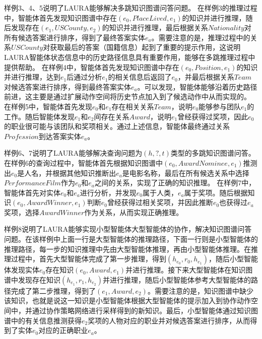 \documentclass[algorithmlist, AutoFakeBold, AutoFakeSlant, figurelist, tablelist, nomlist, engineering, openany]{seuthesix} %
\begin{document}
样例3、4、5说明了LAURA能够解决多跳知识图谱问答问题。
在样例3的推理过程中，智能体首先发现知识图谱中存在$(e_0, PlaceLived, e_1)$的知识并进行推理，随后发现存在$(e_1, USCounty, e_2)$的知识并进行推理，最后根据关系$Nationality$对所有候选答案进行排序，得到了最终答案实体$e_a$。需要注意的是，推理过程中的关系$USCounty$对获取最后的答案（国籍信息）起到了重要的提示作用，这说明LAURA智能体状态信息中的历史路径信息具有重要作用，能够在多跳推理过程中提供帮助。
在样例4中，智能体首先发现知识图谱中存在$(e_0, Position, e_1)$的知识并进行推理，达到$e_1$后通过分析$e_1$的相关信息后返回了$e_0$，并最后根据关系$Team$对候选答案进行排序，得到最终答案实体$e_a$。可以发现，智能体能够沿着历史路径前进，这主要是通过扩展动作空间将历史节点加入到了候选动作中从而实现的。
在样例5中，智能体首先发现$e_0$和$e_1$存在相关关系$Team$，说明$e_0$能够参与团队$e_1$的工作。随后智能体发现$e_1$和$e_2$间存在关系$Award$，说明$e_1$曾经获得过奖项，因此$e_0$的职业很可能与该团队和奖项相关。通过上述信息，智能体最终通过关系$Profession$到达答案实体$e_a$。

样例6、7说明了LAURA能够解决查询问题为$(h, ?, t)$类型的多跳知识图谱问答。
在样例6的查询过程中，智能体首先根据知识图谱中$(e_0, AwardNominee, e_1)$推测出$e_0$是人名，并根据其他知识推断出$e_a$是电影名称，最后在所有候选关系中选择$PerformanceFilm$作为$e_0$和$e_a$之间的关系，实现了正确的知识推理。
在样例7中，智能体首先对实体$e_0$和$e_a$进行分析，并发现$e_0$属于人类，$e_a$属于奖项。随后根据知识$(e_0, AwardWinner, e_1)$判断$e_0$曾经获得过相关奖项，并因此推断$e_0$也获得过$e_a$奖项，选择$AwardWinner$作为关系，从而实现正确推理。

样例8说明了LAURA能够实现小型智能体大型智能体的协作，解决知识图谱问答问题。在该样例中上面一行是大型智能体的推理路径，下面一行则是小型智能体的推理路径，每一步的知识推理中先由大型智能体推理，再由小型智能体推理。在推理过程中，首先大型智能体完成了第一步推理，得到$(h_{e_0}, r_0, h_{e_1})$，随后小型智能体发现实体$e_0$存在知识$(e_0, Award, e_1)$并进行推理。接下来大型智能体在知识图谱中发现存在知识$(h_{e_1}, r_1, h_{e_2})$并进行推理，随后小型智能体参考大型智能体的路径完成了第二步推理，得到了$(e_1, Award, e_2)$。需要注意的是，知识图谱中缺少该知识，也就是说这一知识是小型智能体根据大型智能体的提示加入到协作动作空间中，并通过协作策略网络进行采样得到的新知识。最后，小型智能体通过知识图谱中的有关信息推测获得$e_2$奖项的人物对应的职业并对候选答案进行排序，从而得到了实体$e_0$对应的正确职业$e_a$。
\end{document}
